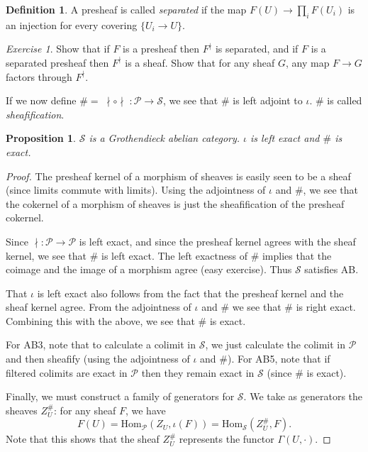 \documentclass[letterpaper,11pt]{article}
\newtheorem{prop}{Proposition}
\theoremstyle{definition}
\newtheorem{defn}{Definition}
\theoremstyle{remark}
\newtheorem{exer}{Exercise}
\begin{document}
\begin{defn} A presheaf is called \emph{separated} if the map $F(U) \rightarrow \prod_i F(U_i)$ is an injection for every covering $\{U_i \rightarrow U\}$.
\end{defn}

\begin{exer} Show that if $F$ is a presheaf then $F^\nmid$ is separated, and if $F$ is a separated presheaf then $F^\nmid$ is a sheaf. Show that for any sheaf $G$, any map $F\rightarrow G$ factors through $F^\nmid$.
\end{exer}

If we now define $\# = \; \nmid \circ \nmid \; : \mathcal{P} \rightarrow \mathcal{S}$, we see that $\#$ is left adjoint to $\iota$. $\#$ is called \emph{sheafification}.

\begin{prop} $\mathcal{S}$ is a Grothendieck abelian category. $\iota$ is left exact and $\#$ is exact.
\end{prop}
\begin{proof} The presheaf kernel of a morphism of sheaves is easily seen to be a sheaf (since limits commute with limits). Using the adjointness of $\iota$ and $\#$, we see that the cokernel of a morphism of sheaves is just the sheafification of the presheaf cokernel.

Since $\nmid : \mathcal{P} \rightarrow \mathcal{P}$ is left exact, and since the presheaf kernel agrees with the sheaf kernel, we see that $\#$ is left exact. The left exactness of $\#$ implies that the coimage and the image of a morphism agree (easy exercise). Thus $\mathcal{S}$ satisfies AB.

That $\iota$ is left exact also follows from the fact that the presheaf kernel and the sheaf kernel agree. From the adjointness of $\iota$ and $\#$ we see that $\#$ is right exact. Combining this with the above, we see that $\#$ is exact.

For AB3, note that to calculate a colimit in $\mathcal{S}$, we just calculate the colimit in $\mathcal{P}$ and then sheafify (using the adjointness of $\iota$ and $\#$). For AB5, note that if filtered colimits are exact in $\mathcal{P}$ then they remain exact in $\mathcal{S}$ (since $\#$ is exact).

Finally, we must construct a family of generators for $\mathcal{S}$. We take as generators the sheaves $Z_U^\#$: for any sheaf $F$, we have
\[
F(U) = \mbox{Hom}_{\mathcal{P}}(Z_U,\iota(F)) = \mbox{Hom}_{\mathcal{S}}(Z_U^\#,F).
\]
Note that this shows that the sheaf $Z_U^\#$ represents the functor $\Gamma(U,\cdot)$.
\end{proof}
\end{document}
